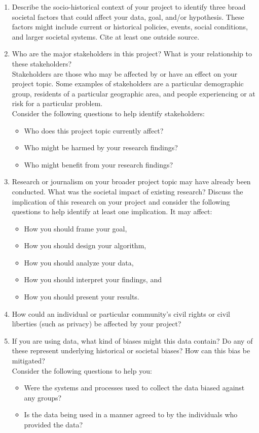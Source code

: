 \documentclass[10pt,twocolumn,letterpaper]{article}
\begin{document}
\begin{enumerate}
\item Describe the socio-historical context of your project to identify three broad societal factors that could affect your data, goal, and/or hypothesis. These factors might include current or historical policies, events, social conditions, and larger societal systems. Cite at least one outside source.
 
\item Who are the major stakeholders in this project? What is your relationship to these stakeholders? \\
Stakeholders are those who may be affected by or have an effect on your project topic. Some examples of stakeholders are a particular demographic group, residents of a particular geographic area, and people experiencing or at risk for a particular problem.\\
Consider the following questions to help identify stakeholders:
    \begin{itemize}
    \item Who does this project topic currently affect?
    \item Who might be harmed by your research findings?
    \item Who might benefit from your research findings?
    \end{itemize}

\item Research or journalism on your broader project topic may have already been conducted. What was the societal impact of existing research? Discuss the implication of this research on your project and consider the following questions to help identify at least one implication. It may affect:
    \begin{itemize}
    \item How you should frame your goal,
    \item How you should design your algorithm,
    \item How you should analyze your data,
    \item How you should interpret your findings, and
    \item How you should present your results.
    \end{itemize}

\item How could an individual or particular community’s civil rights or civil liberties (such as privacy) be affected by your project?

\item If you are using data, what kind of biases might this data contain? Do any of these represent underlying historical or societal biases? How can this bias be mitigated? \\
    Consider the following questions to help you:
    \begin{itemize}
    \item Were the systems and processes used to collect the data biased against any groups?
    \item Is the data being used in a manner agreed to by the individuals who provided the data?
    \end{itemize}


\end{enumerate}
\end{document}
